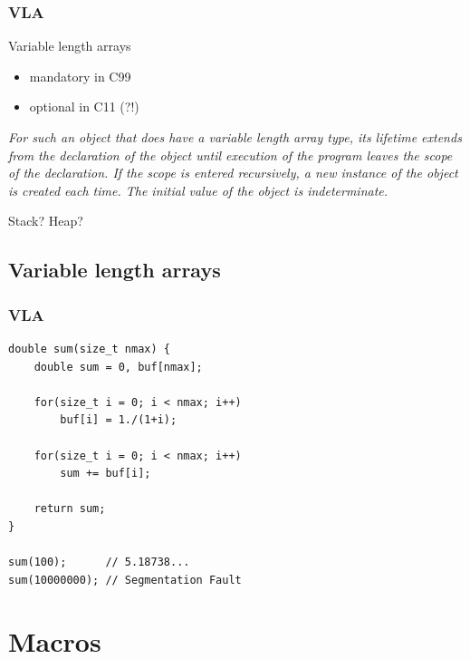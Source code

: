\documentclass[12pt,compress]{beamer}
\begin{document}
\begin{frame}
    \frametitle{VLA}

    Variable length arrays
    \begin{itemize}
    \item mandatory in C99
    \item optional in C11 (?!)
    \end{itemize}

    \vfill

    {{\it For such an object that does have a variable length array type, its
    lifetime extends from the declaration of the object until execution of the
    program leaves the scope of the declaration. If the scope is entered
    recursively, a new instance of the object is created each time. The initial
    value of the object is indeterminate.}} 

    \vfill

    {
        \begin{center}
    {\Large    Stack? \quad Heap?    }
        \end{center}
    }

\end{frame}

\subsection{Variable length arrays}
\begin{frame}[fragile]
    \frametitle{VLA}

\begin{lstlisting}
double sum(size_t nmax) {
    double sum = 0, buf[nmax];

    for(size_t i = 0; i < nmax; i++)
        buf[i] = 1./(1+i);

    for(size_t i = 0; i < nmax; i++)
        sum += buf[i];

    return sum;
}

sum(100);      // 5.18738...
sum(10000000); // Segmentation Fault
\end{lstlisting}
\end{frame}


\section{Macros}

\end{document}
